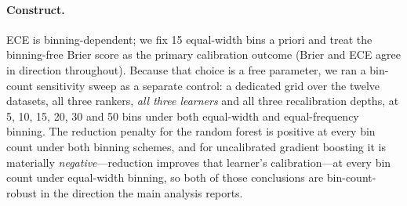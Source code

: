 \documentclass[fleqn,10pt]{wlscirep}
\newcommand{\result}[1]{#1}
\begin{document}
\paragraph{Construct.} ECE is binning-dependent; we fix 15 equal-width bins a priori and treat the
binning-free Brier score as the primary calibration outcome (Brier and ECE agree in direction
throughout). Because that choice is a free parameter, we ran a bin-count sensitivity sweep as a
separate control: a dedicated grid over the twelve datasets, all three rankers, \emph{all three
learners} and all three recalibration depths, at \result{5}, \result{10}, \result{15},
\result{20}, \result{30} and \result{50} bins under both equal-width and equal-frequency binning.
The reduction penalty for the random forest is positive at every bin count under both binning
schemes, and for uncalibrated gradient boosting it is materially \emph{negative}---reduction
improves that learner's calibration---at every bin count under equal-width binning, so both of
those conclusions are bin-count-robust in the direction the main analysis reports.
\end{document}
